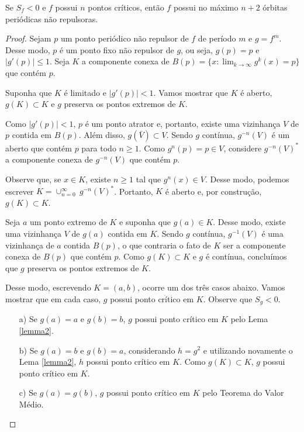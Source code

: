\begin{theorem}[Singer]
Se $S_f < 0$ e $f$ possui $n$ pontos críticos, então $f$ possui no máximo $n+2$ órbitas periódicas não repulsoras.
\end{theorem}

\begin{proof}
Sejam $p$ um ponto periódico não repulsor de $f$ de período $m$ e $g = f^m$. Desse modo, $p$ é um ponto fixo não repulsor de $g$, ou seja, $g(p) = p$ e $|g'(p)| \leq 1$. Seja $K$ a componente conexa de $B(p) = \{ x : \lim_{k \to \infty} g^k(x) = p \}$ que contém $p$.

Suponha que $K$ é limitado e $|g'(p)| < 1$. Vamos mostrar que $K$ é aberto, $g(K) \subset K$ e $g$ preserva os pontos extremos de $K$.

Como $|g'(p)| < 1$, $p$ é um ponto atrator e, portanto, existe uma vizinhança $V$ de $p$ contida em $B(p)$. Além disso, $g(\bar{V}) \subset V$. Sendo $g$ contínua, $g^{-n}(V)$ é um aberto que contém $p$ para todo $n \geq 1$. Como $g^n(p) = p \in V$, considere $g^{-n}(V)^*$ a componente conexa de $g^{-n}(V)$ que contém $p$.

Observe que, se $x \in K$, existe $n \geq 1$ tal que $g^n(x) \in V$. Desse modo, podemos escrever $K = \cup^{\infty}_{n = 0} \ g^{-n}(V)^*$. Portanto, $K$ é aberto e, por construção, $g(K) \subset K$.

Seja $a$ um ponto extremo de $K$ e suponha que $g(a) \in K$. Desse modo, existe uma vizinhança $V$ de $g(a)$ contida em $K$. Sendo $g$ contínua, $g^{-1}(V)$ é uma vizinhança de $a$ contida $B(p)$, o que contraria o fato de $K$ ser a componente conexa de $B(p)$ que contém $p$. Como $g(K) \subset K$ e $g$ é contínua, concluímos que $g$ preserva os pontos extremos de $K$.

Desse modo, escrevendo $K = (a, b)$, ocorre um dos três casos abaixo. Vamos mostrar que em cada caso, $g$ possui ponto crítico em $K$. Observe que $S_g < 0$.

\begin{enumerate}

\item[a)] Se $g(a) = a$ e $g(b) = b$, $g$ possui ponto crítico em $K$ pelo Lema \ref{lemma2}.
\item[b)] Se $g(a) = b$ e $g(b) = a$,  considerando $h = g^2$ e utilizando novamente o Lema \ref{lemma2}, $h$ possui ponto crítico em $K$. Como $g(K) \subset K$, $g$ possui ponto crítico em $K$.
\item[c)] Se $g(a) = g(b)$, $g$ possui ponto crítico em $K$ pelo Teorema do Valor Médio.
\end{enumerate}


\end{proof}
